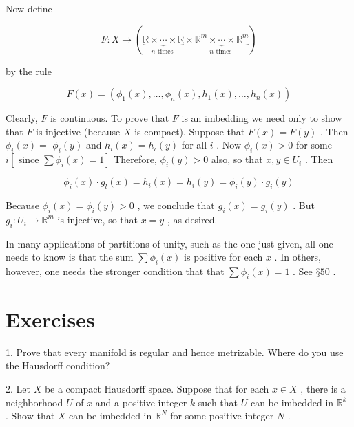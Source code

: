 Now define

\[
F : X \rightarrow  \left( {\underset{n\text{ times }}{\underbrace{\mathbb{R} \times  \cdots  \times  \mathbb{R}}} \times  \underset{n\text{ times }}{\underbrace{{\mathbb{R}}^{m} \times  \cdots  \times  {\mathbb{R}}^{m}}}}\right)
\]

by the rule

\[
F\left( x\right)  = \left( {{\phi }_{1}\left( x\right) ,\ldots ,{\phi }_{n}\left( x\right) ,{h}_{1}\left( x\right) ,\ldots ,{h}_{n}\left( x\right) }\right)
\]

Clearly, \(F\) is continuous. To prove that \(F\) is an imbedding we need only to show that \(F\) is injective (because \(X\) is compact). Suppose that \(F\left( x\right)  = F\left( y\right)\) . Then \({\phi }_{i}\left( x\right)  =\)  \({\phi }_{i}\left( y\right)\) and \({h}_{i}\left( x\right)  = {h}_{\iota }\left( y\right)\) for all \(i\) . Now \({\phi }_{i}\left( x\right)  > 0\) for some \(i\left\lbrack  {\text{ since }\sum {\phi }_{i}\left( x\right)  = 1}\right\rbrack\) Therefore, \({\phi }_{i}\left( y\right)  > 0\) also, so that \(x,y \in  {U}_{i}\) . Then

\[
{\phi }_{i}\left( x\right)  \cdot  {g}_{l}\left( x\right)  = {h}_{i}\left( x\right)  = {h}_{i}\left( y\right)  = {\phi }_{i}\left( y\right)  \cdot  {g}_{i}\left( y\right)
\]

Because \({\phi }_{i}\left( x\right)  = {\phi }_{i}\left( y\right)  > 0\) , we conclude that \({g}_{i}\left( x\right)  = {g}_{i}\left( y\right)\) . But \({g}_{i} : {U}_{i} \rightarrow  {\mathbb{R}}^{m}\) is injective, so that \(x = y\) , as desired.

In many applications of partitions of unity, such as the one just given, all one needs to know is that the sum \(\sum {\phi }_{i}\left( x\right)\) is positive for each \(x\) . In others, however, one needs the stronger condition that that \(\sum {\phi }_{i}\left( x\right)  = 1\) . See \(§{50}\) .

\section*{Exercises}

1. Prove that every manifold is regular and hence metrizable. Where do you use the Hausdorff condition?

2. Let \(X\) be a compact Hausdorff space. Suppose that for each \(x \in  X\) , there is a neighborhood \(U\) of \(x\) and a positive integer \(k\) such that \(U\) can be imbedded in \({\mathbb{R}}^{k}\) . Show that \(X\) can be imbedded in \({\mathbb{R}}^{N}\) for some positive integer \(N\) .

